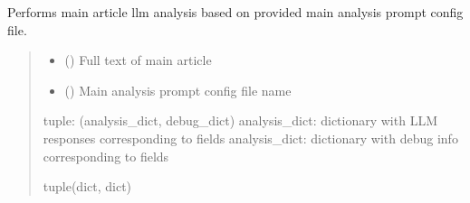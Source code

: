\documentclass[letterpaper,10pt,english]{sphinxmanual}
\begin{document}
\begin{fulllineitems}
\label{\detokenize{direct_analysis:direct_analysis.analyze_paper_llm}}
\pysigstartsignatures
\pysiglinewithargsret
{}
{\sphinxparamcomma {}}
{}
\pysigstopsignatures
\sphinxAtStartPar
Performs main article llm analysis based on provided main analysis prompt config file.
\begin{quote}\begin{description}
\begin{itemize}
\item {} 
\sphinxAtStartPar
{} () \textendash{} Full text of main article

\item {} 
\sphinxAtStartPar
{} () \textendash{} Main analysis prompt config file name

\end{itemize}

\sphinxAtStartPar
tuple: (analysis\_dict, debug\_dict)
analysis\_dict: dictionary with LLM responses corresponding to fields
analysis\_dict: dictionary with debug info corresponding to fields

\sphinxAtStartPar
tuple(dict, dict)

\end{description}\end{quote}

\end{fulllineitems}

\end{document}
